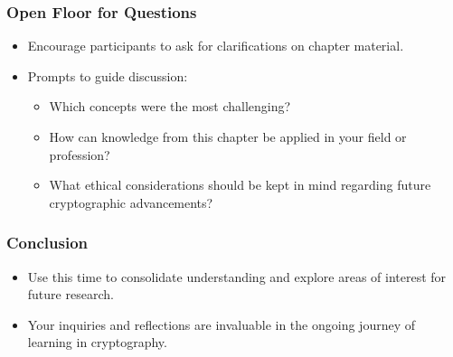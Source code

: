 \documentclass{beamer}
\begin{document}
\begin{frame}[fragile]
    \frametitle{Open Floor for Questions}
    \begin{itemize}
        \item Encourage participants to ask for clarifications on chapter material.
        \item Prompts to guide discussion:
            \begin{itemize}
                \item Which concepts were the most challenging?
                \item How can knowledge from this chapter be applied in your field or profession?
                \item What ethical considerations should be kept in mind regarding future cryptographic advancements?
            \end{itemize}
    \end{itemize}
\end{frame}

\begin{frame}[fragile]
    \frametitle{Conclusion}
    \begin{itemize}
        \item Use this time to consolidate understanding and explore areas of interest for future research.
        \item Your inquiries and reflections are invaluable in the ongoing journey of learning in cryptography.
    \end{itemize}
\end{frame}
\end{document}
